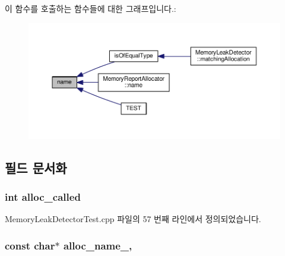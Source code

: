 이 함수를 호출하는 함수들에 대한 그래프입니다.\+:
\nopagebreak
\begin{figure}[H]
\begin{center}
\leavevmode
\includegraphics[width=350pt]{class_test_memory_allocator_a6a96605bec5749750a0b4be6e2d6e721_icgraph}
\end{center}
\end{figure}




\subsection{필드 문서화}
\subsubsection[{\texorpdfstring{alloc\+\_\+called}{alloc_called}}]{\setlength{\rightskip}{0pt plus 5cm}int alloc\+\_\+called}\hypertarget{class_new_allocator_for_memory_leak_detection_test_a2804c2bae21eb67c6534a07ff8bcb052}{}\label{class_new_allocator_for_memory_leak_detection_test_a2804c2bae21eb67c6534a07ff8bcb052}


Memory\+Leak\+Detector\+Test.\+cpp 파일의 57 번째 라인에서 정의되었습니다.

\subsubsection[{\texorpdfstring{alloc\+\_\+name\+\_\+}{alloc_name_}}]{\setlength{\rightskip}{0pt plus 5cm}const char$\ast$ alloc\+\_\+name\+\_\+\hspace{0.3cm}{\ttfamily [protected]}, {\ttfamily [inherited]}}\hypertarget{class_test_memory_allocator_ae5a98ff3b709da10db95a0ed03362548}{}\label{class_test_memory_allocator_ae5a98ff3b709da10db95a0ed03362548}


